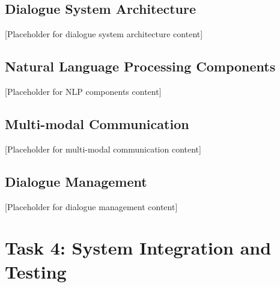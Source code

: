 \documentclass[12pt,a4paper]{article}
\begin{document}

\subsection{Dialogue System Architecture}


[Placeholder for dialogue system architecture content]

\subsection{Natural Language Processing Components}


[Placeholder for NLP components content]

\subsection{Multi-modal Communication}


[Placeholder for multi-modal communication content]

\subsection{Dialogue Management}


[Placeholder for dialogue management content]

\section{Task 4: System Integration and Testing}

\end{document}
